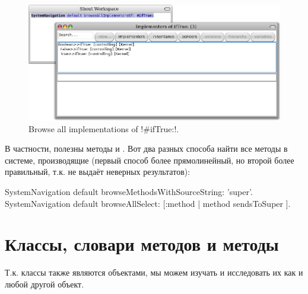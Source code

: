 \documentclass[a4paper,10pt,twoside]{book}
\begin{document}
{\begin{figure}[ht]\centering
	\includegraphics[width=\linewidth]{implementors}
	\caption{Browse all implementations of \ct!\#ifTrue:!.}
\end{figure}

В частности, полезны методы  и . Вот два разных способа найти все методы в системе, производящие  (первый способ более прямолинейный, но второй более правильный, т.к. не выдаёт неверных результатов):
\begin{code}{}
SystemNavigation default browseMethodsWithSourceString: 'super'.
SystemNavigation default browseAllSelect: [:method | method sendsToSuper ].
\end{code}

\section{Классы, словари методов и методы}

Т.к. классы также являются объектами, мы можем изучать и исследовать их как и любой другой объект.


}
\end{document}
